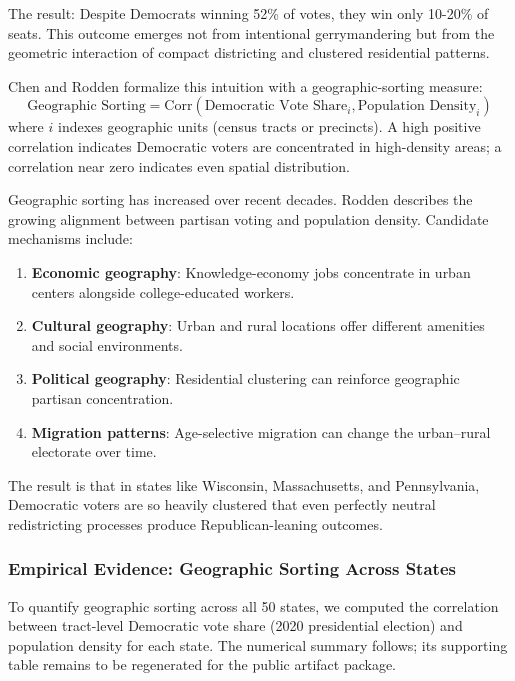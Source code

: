 The result: Despite Democrats winning 52\% of votes, they win only 10-20\% of seats. This outcome emerges not from intentional gerrymandering but from the geometric interaction of compact districting and clustered residential patterns.

Chen and Rodden \citep{chen2013unintentional} formalize this intuition with a geographic-sorting measure:
\begin{equation}
\text{Geographic Sorting} = \text{Corr}(\text{Democratic Vote Share}_i, \text{Population Density}_i)
\end{equation}
where $i$ indexes geographic units (census tracts or precincts). A high positive correlation indicates Democratic voters are concentrated in high-density areas; a correlation near zero indicates even spatial distribution.

Geographic sorting has increased over recent decades. Rodden \citep{rodden2019why} describes the growing alignment between partisan voting and population density. Candidate mechanisms include:

\begin{enumerate}
\item \textbf{Economic geography}: Knowledge-economy jobs concentrate in urban centers alongside college-educated workers.
\item \textbf{Cultural geography}: Urban and rural locations offer different amenities and social environments.
\item \textbf{Political geography}: Residential clustering can reinforce geographic partisan concentration.
\item \textbf{Migration patterns}: Age-selective migration can change the urban--rural electorate over time.
\end{enumerate}

The result is that in states like Wisconsin, Massachusetts, and Pennsylvania, Democratic voters are so heavily clustered that even perfectly neutral redistricting processes produce Republican-leaning outcomes.

\subsubsection{Empirical Evidence: Geographic Sorting Across States}
\label{sec:sorting_correlation}

To quantify geographic sorting across all 50 states, we computed the correlation between tract-level Democratic vote share (2020 presidential election) and population density for each state. The numerical summary follows; its supporting table remains to be regenerated for the public artifact package.

